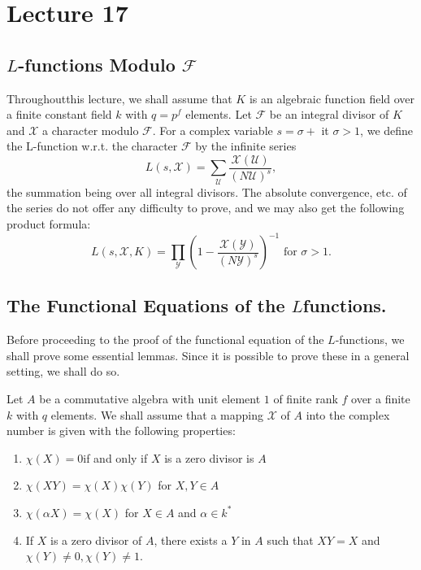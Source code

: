\chapter{Lecture 17}\label{chap17}%

\setcounter{section}{29}
\section{\texorpdfstring{$L$}{L}-functions Modulo \texorpdfstring{$\mathcal{F}$}{F}}\label{chap17:sec30}%

Throughout\pageoriginale this lecture, we shall assume that $K$ is an algebraic
function field over a finite constant field $k$ with $q = p^f$
elements. Let $\mathcal{F}$ be an integral divisor of $K$ and
$\mathcal{X}$ a character modulo $\mathcal{F}$. For a complex variable
$s = \sigma + $ it $\sigma > 1$, we define the L-function w.r.t. the
character $\mathcal{F}$ by the infinite series  
$$
L(s, \mathcal{X} ) = \sum_{\mathscr{U}} \frac{\mathcal{X}
  (\mathscr{U})}{(N \mathscr{U})^s}, 
$$
the summation being over all integral divisors. The absolute
convergence, etc. of the series do not offer any difficulty to prove,
and we may also get the following product formula: 
$$
L (s, \mathcal{X}, K) = \prod_{\mathscr{Y}} \left(1- \frac{\mathcal{X}
  (\mathscr{Y})}{(N \mathscr{Y})^s}\right)^{-1} \text{ for } \sigma > 1. 
$$

\section{The Functional Equations of the \texorpdfstring{$L$}-functions.}%

Before proceeding to the proof of the functional equation of the
$L$-functions, we shall prove some essential lemmas. Since it is
possible to prove these in a general setting, we shall do so. 

Let $A$ be a commutative algebra with unit element $1$ of finite rank
$f$ over a finite $k$ with $q$ elements. We shall assume that a
mapping $\mathcal{X}$ of $A$ into the complex number is given with the
following properties: 
\begin{enumerate}[1)]
\item $\chi (X)=0$\pageoriginale if and only if $X$ is a zero divisor is $A$
\item $\chi (XY)=\chi (X)\chi(Y)$ for $X,Y\in A$
\item $\chi (\alpha X)=\chi (X)$ for $X \in A$ and $\alpha \in k^*$
\item If $X$ is a zero divisor of $A$, there exists a $Y$ in $A$ such
  that $XY=X$ and $\chi (Y)\neq 0, \chi(Y)\neq 1$. 
\end{enumerate}

